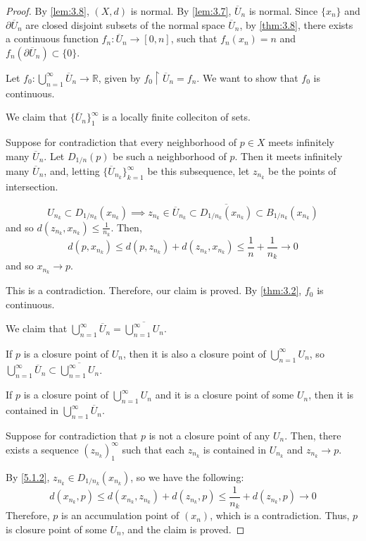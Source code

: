 \documentclass[openany, amssymb, psamsfonts]{amsart}
\let\fullref\autoref
\theoremstyle{definition}
\numberwithin{equation}{section}
\begin{document}
\begin{proof}
  By \fullref{lem:3.8}, $(X,d)$ is normal. By \fullref{lem:3.7}, $\overline{U}_n$ is normal. Since $\{x_n\}$ and $\partial\overline{U}_n$ are closed disjoint subsets of the normal space $\overline{U}_n$, by \fullref{thm:3.8}, there exists a continuous function $f_n: \overline{U}_n \to [0,n]$, such that $f_n(x_n) = n$ and $f_n(\partial\overline{U}_n) \subset \{0\}$. 

  Let $f_0: \bigcup_{n=1}^\infty \overline{U}_n \to \mathbb R$, given by $f_0\restriction \overline{U}_n = f_n$. We want to show that $f_0$ is continuous.

  We claim that $\{\overline{U}_n\}_1^\infty$ is a locally finite colleciton of sets. 

  Suppose for contradiction that every neighborhood of $p \in X$ meets infinitely many $\overline{U}_{n}$. 
  Let $D_{1/n}(p)$ be such a neighborhood of $p$. Then it meets infinitely many $\overline{U}_{n}$, and, letting $\{\overline{U}_{n_k}\}_{k=1}^\infty$ be this subsequence, let $z_{n_k}$ be the points of intersection. 

  $$U_{n_k} \subset D_{1/n_k}(x_{n_k})\implies z_{n_k} \in \overline{U}_{n_k} \subset \overline{D_{1/n_k}(x_{n_k})}\subset B_{1/n_k}(x_{n_k})$$ and so $d(z_{n_k}, x_{n_k}) \le \frac1{n_k}$. Then,
  \[d(p, x_{n_k}) \le d(p, z_{n_k}) + d(z_{n_k}, x_{n_k}) \le \frac1{n} + \frac1{n_k}\to 0\]
  and so $x_{n_k} \to p$. 

  This is a contradiction. Therefore, our claim is proved. By \fullref{thm:3.2}, $f_0$ is continuous. 

  We claim that $\bigcup_{n=1}^\infty \overline{U}_n = \overline{\bigcup_{n=1}^\infty U_n}$. 

  If $p$ is a closure point of $U_n$, then it is also a closure point of $\bigcup_{n=1}^\infty U_n$, so $\bigcup_{n=1}^\infty \overline{U}_n \subset \overline{\bigcup_{n=1}^\infty U_n}$.

  If $p$ is a closure point of $\bigcup_{n=1}^\infty U_n$ and it is a closure point of some $U_n$, then it is contained in $\bigcup_{n=1}^\infty \overline{U}_n$. 

  Suppose for contradiction that $p$ is not a closure point of any $U_n$. Then, there exists a sequence $(z_{n_k})_1^\infty$ such that each $z_{n_k}$ is contained in $U_{n_k}$ and $z_{n_k}\to p$. 

  By \ref{5.1.2}, $z_{n_k} \in D_{1/n_k}(x_{n_k})$, so we have the following:
  \[
    d(x_{n_k}, p) \le d(x_{n_k}, z_{n_k}) + d(z_{n_k}, p) \le \frac1{n_k} + d(z_{n_k}, p) \to 0
  \]
  Therefore, $p$ is an accumulation point of $(x_n)$, which is a contradiction. Thus, $p$ is closure point of some $U_n$, and the claim is proved. 


\end{proof}
\end{document}
